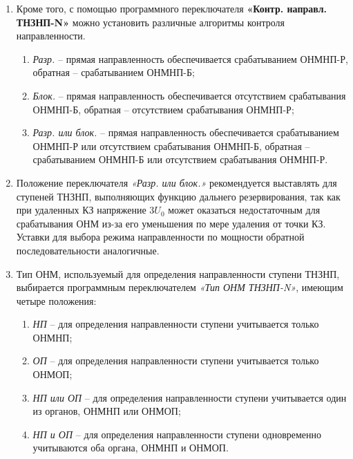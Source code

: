 \begin{enumerate}[label=\arabic{section}.\arabic{subsection}.\arabic{enumi}, labelsep=4pt, leftmargin=0pt, itemindent=57pt, itemsep=0pt, parsep=5pt]
\begin{enumerate}[label=\arabic{section}.\arabic{subsection}.\arabic{enumi}.\arabic*, labelsep=4pt, leftmargin=0em, itemindent=65pt, parsep=0pt]
\begin{enumerate}[label=\arabic*)]
    \item \textit{Ненапр.} -- ступень выполнена ненаправленной;
    \item \textit{Прямо} -- ступень выполнена прямонаправленной;
    \item \textit{Обратно} -- ступень выполнена обратнонаправленной.
\end{enumerate}

\item
Кроме того, с помощью программного переключателя \textbf{«Контр. направл. ТНЗНП-N»} можно установить различные алгоритмы контроля направленности.

\begin{enumerate}[label=\arabic*)]
    \item \textit{Разр.} --  прямая направленность обеспечивается срабатыванием ОНМНП-Р, обратная -- срабатыванием ОНМНП-Б;
    \item \textit{Блок.} -- прямая направленность обеспечивается отсутствием срабатывания ОНМНП-Б, обратная -- отсутствием срабатывания ОНМНП-Р;
    \item \textit{Разр. или блок.} -- прямая направленность обеспечивается срабатыванием ОНМНП-Р или отсутствием срабатывания ОНМНП-Б, обратная -- срабатыванием ОНМНП-Б или отсутствием срабатывания ОНМНП-Р.
\end{enumerate}

\item
Положение переключателя \textit{«Разр. или блок.»} рекомендуется выставлять для ступеней ТНЗНП, выполняющих функцию дальнего резервирования, так как при удаленных КЗ напряжение $3U_0$ может оказаться недостаточным для срабатывания ОНМ из-за его уменьшения по мере удаления от точки КЗ. Уставки для выбора режима направленности по мощности обратной последовательности аналогичные.

\item
Тип ОНМ, используемый для определения направленности ступени ТНЗНП, выбирается программным переключателем \textit{«Тип ОНМ ТНЗНП-N»}, имеющим четыре положения:

\begin{enumerate}[label=\arabic*)]
    \item \textit{НП} -- для определения направленности ступени учитывается только ОНМНП;
    \item \textit{ОП} -- для определения направленности ступени учитывается только ОНМОП;
    \item \textit{НП или ОП} -- для определения направленности ступени учитывается один из органов, ОНМНП или ОНМОП;
    \item \textit{НП и ОП} -- для определения направленности ступени одновременно учитываются оба органа, ОНМНП и ОНМОП.
\end{enumerate}


\end{enumerate}
\end{enumerate}
